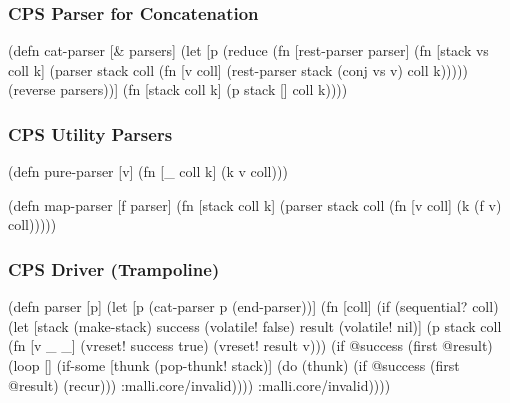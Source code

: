 \documentclass{beamer}
\begin{document}

\begin{frame}[fragile]
\frametitle{CPS Parser for Concatenation}

{\scriptsize
\begin{semiverbatim}
(defn cat-parser [& parsers]
  (let [p (reduce (fn [rest-parser parser]
                    (fn [stack vs coll k]
                      (parser stack coll
                              (fn [v coll]
                                (rest-parser stack (conj vs v) coll k)))))
                  (reverse parsers))]
    (fn [stack coll k] (p stack [] coll k))))
\end{semiverbatim}
}

\end{frame}


\begin{frame}[fragile]
\frametitle{CPS Utility Parsers}

\begin{semiverbatim}
(defn pure-parser [v] (fn [_ coll k] (k v coll)))
\end{semiverbatim}

\begin{semiverbatim}
(defn map-parser [f parser]
  (fn [stack coll k]
    (parser stack coll
            (fn [v coll] (k (f v) coll)))))
\end{semiverbatim}

\end{frame}


\begin{frame}[fragile]
\frametitle{CPS Driver (Trampoline)}

{\scriptsize
\begin{semiverbatim}
(defn parser [p]
  (let [p (cat-parser p (end-parser))]
    (fn [coll]
      (if (sequential? coll)
        (let [stack (make-stack)
              success (volatile! false)
              result (volatile! nil)]
          (p stack coll (fn [v _ _]
                          (vreset! success true)
                          (vreset! result v)))
          (if @success
            (first @result)
            (loop []
              (if-some [thunk (pop-thunk! stack)]
                (do
                  (thunk)
                  (if @success
                    (first @result)
                    (recur)))
                :malli.core/invalid))))
        :malli.core/invalid))))
\end{semiverbatim}
}

\end{frame}
\end{document}

